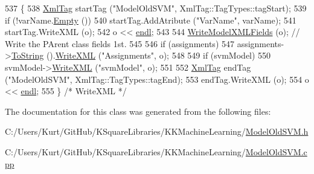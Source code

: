 \begin{DoxyCode}
537 \{
538   \hyperlink{class_k_k_b_1_1_xml_tag}{XmlTag}  startTag (\textcolor{stringliteral}{"ModelOldSVM"},  XmlTag::TagTypes::tagStart);
539   \textcolor{keywordflow}{if}  (!varName.\hyperlink{class_k_k_b_1_1_k_k_str_ac69942f73fffd672ec2a6e1c410afdb6}{Empty} ())
540     startTag.AddAtribute (\textcolor{stringliteral}{"VarName"}, varName);
541   startTag.WriteXML (o);
542   o << \hyperlink{namespace_k_k_b_ad1f50f65af6adc8fa9e6f62d007818a8}{endl};
543 
544   \hyperlink{class_k_k_m_l_l_1_1_model_a560829876c8ca002f00592e428a780a2}{WriteModelXMLFields} (o);  \textcolor{comment}{// Write the PArent class fields 1st.}
545 
546   \textcolor{keywordflow}{if}  (assignments)
547     assignments->\hyperlink{class_k_k_m_l_l_1_1_class_assignments_a43cfc29386642162927f4492d5be7abb}{ToString} ().\hyperlink{class_k_k_b_1_1_k_k_str_a7de8ac49f70cdcdf2cc31786d23b8a62}{WriteXML} (\textcolor{stringliteral}{"Assignments"}, o);
548 
549   \textcolor{keywordflow}{if}  (svmModel)
550     svmModel->\hyperlink{class_k_k_m_l_l_1_1_s_v_m_model_acb6a791944907884c0c5992c5215a42c}{WriteXML} (\textcolor{stringliteral}{"svmModel"}, o);
551 
552   \hyperlink{class_k_k_b_1_1_xml_tag}{XmlTag}  endTag (\textcolor{stringliteral}{"ModelOldSVM"}, XmlTag::TagTypes::tagEnd);
553   endTag.WriteXML (o);
554   o << \hyperlink{namespace_k_k_b_ad1f50f65af6adc8fa9e6f62d007818a8}{endl};
555 \}  \textcolor{comment}{/* WriteXML */}
\end{DoxyCode}


The documentation for this class was generated from the following files\+:\begin{DoxyCompactItemize}
\item 
C\+:/\+Users/\+Kurt/\+Git\+Hub/\+K\+Square\+Libraries/\+K\+K\+Machine\+Learning/\hyperlink{_model_old_s_v_m_8h}{Model\+Old\+S\+V\+M.\+h}\item 
C\+:/\+Users/\+Kurt/\+Git\+Hub/\+K\+Square\+Libraries/\+K\+K\+Machine\+Learning/\hyperlink{_model_old_s_v_m_8cpp}{Model\+Old\+S\+V\+M.\+cpp}\end{DoxyCompactItemize}
